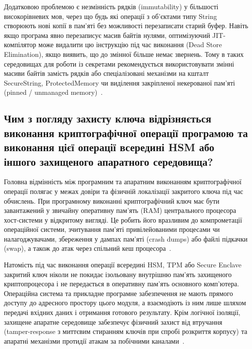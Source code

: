 Додатковою проблемою є незмінність рядків (immutability) у більшості високорівневих мов, через що будь
які операції з об'єктами типу String створюють нові копії в пам'яті без можливості перезаписати старий
буфер. Навіть якщо програма явно перезаписує масив байтів нулями, оптимізуючий JIT-компілятор може
видалити цю інструкцію під час виконання (Dead Store Elimination), якщо виявить, що до змінної більше немає
звернень. Тому в таких середовищах для роботи із секретами рекомендується використовувати змінні масиви
байтів замість рядків або спеціалізовані механізми на кшталт SecureString, ProtectedMemory чи
виділення закріпленої некерованої пам'яті (pinned / unmanaged memory)~\cite{owaspstorage, cwe316}.

\subsection{Чим з погляду захисту ключа відрізняється виконання криптографічної операції програмою та виконання цієї операції всередині HSM або іншого захищеного апаратного середовища?}

Головна відмінність між програмним та апаратним виконанням криптографічної операції полягає у межах
довіри та фізичній локалізації закритого ключа під час обчислень. При програмному виконанні
криптографічний ключ має бути завантажений у звичайну оперативну пам'ять (RAM) центрального
процесора хост-системи у відкритому вигляді. Це робить його вразливим до компрометації операційної
системи, зчитування пам'яті привілейованими процесами чи налагоджувачами, збереження у дампах пам'яті
(crash dumps) або файлі підкачки (swap), а також до атак через спільний кеш
процесора~\cite{cwe316, owaspkey}.

Натомість під час виконання операції всередині HSM, TPM або Secure Enclave закритий ключ ніколи не
покидає ізольовану внутрішню пам'ять захищеного криптопроцесора і не передається в оперативну пам'ять
основного комп'ютера. Операційна система та прикладне програмне забезпечення не мають прямого
доступу до адресного простору цього модуля, а взаємодіють із ним лише шляхом передачі вхідних даних і
отримання готового результату. Крім логічної ізоляції, захищене апаратне середовище забезпечує фізичний
захист від втручання (tamper-response з миттєвим стиранням ключів при спробі розкриття корпусу) та
апаратні механізми протидії атакам за побічними каналами~\cite{awshsm, nistfips}.
